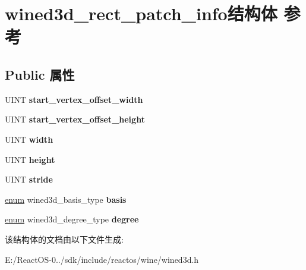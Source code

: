 \hypertarget{structwined3d__rect__patch__info}{}\section{wined3d\+\_\+rect\+\_\+patch\+\_\+info结构体 参考}
\label{structwined3d__rect__patch__info}
\subsection*{Public 属性}
\begin{DoxyCompactItemize}
\item 
\mbox{\label{structwined3d__rect__patch__info_a5d939c7e11745c405f4f88b3848fb9b9}} 
U\+I\+NT {\bfseries start\+\_\+vertex\+\_\+offset\+\_\+width}
\item 
\mbox{\label{structwined3d__rect__patch__info_ad06677e5e5d7bd83936dda74219c28a5}} 
U\+I\+NT {\bfseries start\+\_\+vertex\+\_\+offset\+\_\+height}
\item 
\mbox{\label{structwined3d__rect__patch__info_adbedd6c5d2226edc4ddf0f1a301f3293}} 
U\+I\+NT {\bfseries width}
\item 
\mbox{\label{structwined3d__rect__patch__info_a7594cbf3be4f8c60e3f31403aef01475}} 
U\+I\+NT {\bfseries height}
\item 
\mbox{\label{structwined3d__rect__patch__info_abfebe5dfc4f0eeecf2553ee07d4970f2}} 
U\+I\+NT {\bfseries stride}
\item 
\mbox{\label{structwined3d__rect__patch__info_afec0d52f834d21d46712ad8bc3d18159}} 
\hyperlink{interfaceenum}{enum} wined3d\+\_\+basis\+\_\+type {\bfseries basis}
\item 
\mbox{\label{structwined3d__rect__patch__info_a6f66776f4031caa693e819c5a83d58cc}} 
\hyperlink{interfaceenum}{enum} wined3d\+\_\+degree\+\_\+type {\bfseries degree}
\end{DoxyCompactItemize}


该结构体的文档由以下文件生成\+:\begin{DoxyCompactItemize}
\item 
E\+:/\+React\+O\+S-\/0../sdk/include/reactos/wine/wined3d.\+h\end{DoxyCompactItemize}
